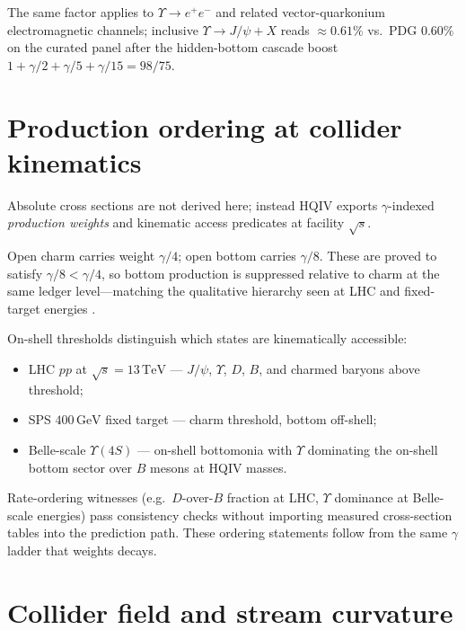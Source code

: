 \documentclass[11pt]{amsart}
\begin{document}
The same factor applies to $\Upsilon\to e^+e^-$ and related vector-quarkonium
electromagnetic channels; inclusive $\Upsilon\to J/\psi+X$ reads
$\approx 0.61\%$ vs.\ PDG $0.60\%$ on the curated panel after the hidden-bottom
cascade boost $1+\gamma/2+\gamma/5+\gamma/15=98/75$.

\section{Production ordering at collider kinematics}
\label{sec:production}

Absolute cross sections are not derived here; instead HQIV exports
$\gamma$-indexed \emph{production weights} and kinematic access predicates at
facility $\sqrt{s}$.

Open charm carries weight $\gamma/4$; open bottom carries $\gamma/8$.
These are proved to satisfy $\gamma/8<\gamma/4$, so bottom production is
suppressed relative to charm at the same ledger level---matching the qualitative
hierarchy seen at LHC and fixed-target energies \cite{cms2018,herb1977,pdg2024}.

On-shell thresholds distinguish which states are kinematically accessible:
\begin{itemize}[leftmargin=2em]
\item LHC $pp$ at $\sqrt{s}=13\,\mathrm{TeV}$ \cite{cms2018,pdg2024} --- $J/\psi$,
  $\Upsilon$, $D$, $B$, and charmed baryons above threshold;
\item SPS $400\,\mathrm{GeV}$ fixed target \cite{herb1977,pdg2024} --- charm
  threshold, bottom off-shell;
\item Belle-scale $\Upsilon(4S)$ \cite{belle2002,pdg2024} --- on-shell bottomonia
  with $\Upsilon$ dominating the on-shell bottom sector over $B$ mesons at HQIV
  masses.
\end{itemize}

Rate-ordering witnesses (e.g.\ $D$-over-$B$ fraction at LHC, $\Upsilon$ dominance
at Belle-scale energies) pass consistency checks without importing measured
cross-section tables into the prediction path.
These ordering statements follow from the same $\gamma$ ladder that weights decays.

\section{Collider field and stream curvature}
\label{sec:collider-environment}
\end{document}
